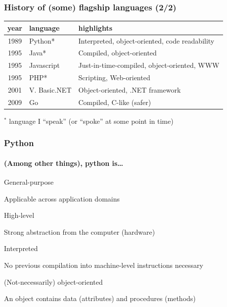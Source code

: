 \documentclass[xcolor=x11names]{beamer}
\begin{document}
\begin{frame}
\frametitle{History of (some) flagship languages (2/2)}

\begin{center}
\begin{tabular}{clp{79mm}}
\hline
\bf year	& \bf language	& \bf highlights	\\
\hline
1989	& \alert{Python}*	& Interpreted, object-oriented, code readability \\
1995	& Java*			& Compiled, object-oriented	\\
1995	& Javascript	&Just-in-time-compiled, object-oriented, WWW	\\
1995	& PHP*			& Scripting, Web-oriented	\\
2001	& V\@. Basic.NET	& Object-oriented, .NET framework	\\
2009	& Go			& Compiled, C-like (safer)	\\
\hline
\end{tabular}
\end{center}

\bigskip
$^*$ language I ``speak'' (or ``spoke'' at some point in time)
\end{frame}

\begin{frame}
\frametitle{Python}
\framesubtitle{(Among other things), python is\ldots}

\alert{General-purpose}

Applicable across application domains
\bigskip 	\pause

\alert{High-level}

Strong abstraction from the computer (hardware)
\bigskip 	\pause

\alert{Interpreted}

No previous compilation into machine-level instructions necessary
\bigskip 	\pause

\alert{(Not-necessarily) object-oriented}

An object contains data (attributes) and procedures (methods)
\end{frame}
\end{document}
